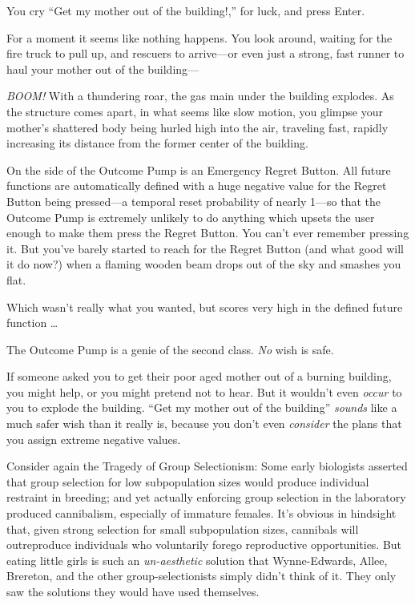 {
 You cry ``Get my mother out of the
building!,'' for luck, and press Enter.}

{
 For a moment it seems like nothing happens. You look around,
waiting for the fire truck to pull up, and rescuers to arrive---or even
just a strong, fast runner to haul your mother out of the building---}

{
 \textit{BOOM!} With a thundering roar, the gas main under the
building explodes. As the structure comes apart, in what seems like
slow motion, you glimpse your mother's shattered body
being hurled high into the air, traveling fast, rapidly increasing its
distance from the former center of the building.}

{
 On the side of the Outcome Pump is an Emergency Regret Button. All
future functions are automatically defined with a huge negative value
for the Regret Button being pressed---a temporal reset probability of
nearly 1---so that the Outcome Pump is extremely unlikely to do
anything which upsets the user enough to make them press the Regret
Button. You can't ever remember pressing it. But
you've barely started to reach for the Regret Button
(and what good will it do now?) when a flaming wooden beam drops out of
the sky and smashes you flat.}

{
 Which wasn't really what you wanted, but scores
very high in the defined future function \ldots}

{
 The Outcome Pump is a genie of the second class. \textit{No} wish
is safe.}

{
 If someone asked you to get their poor aged mother out of a
burning building, you might help, or you might pretend not to hear. But
it wouldn't even \textit{occur} to you to explode the
building. ``Get my mother out of the
building'' \textit{sounds} like a much safer wish
than it really is, because you don't even
\textit{consider} the plans that you assign extreme negative values.}

{
 Consider again the Tragedy of Group Selectionism: Some early
biologists asserted that group selection for low subpopulation sizes
would produce individual restraint in breeding; and yet actually
enforcing group selection in the laboratory produced cannibalism,
especially of immature females. It's obvious in
hindsight that, given strong selection for small subpopulation sizes,
cannibals will outreproduce individuals who voluntarily forego
reproductive opportunities. But eating little girls is such an
\textit{un-aesthetic} solution that Wynne-Edwards, Allee, Brereton, and
the other group-selectionists simply didn't think of
it. They only saw the solutions they would have used themselves.}

